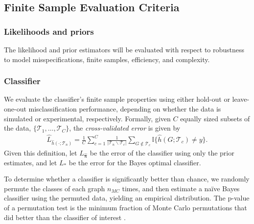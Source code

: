 \documentclass[10pt,journal,cspaper,compsoc]{IEEEtran}
\newcommand{\II}{\mathbb{I}}           %
\providecommand{\mc}[1]{\mathcal{#1}}
\providecommand{\wh}[1]{\widehat{#1}}
\providecommand{\mhb}[1]{\hat{\boldsymbol{#1}}}
\begin{document}
\subsection{Finite Sample Evaluation Criteria} %
\label{sub:evaluation_criteria}


\subsubsection{Likelihoods and priors} %
\label{ssub:likelihoods_and_priors}

The likelihood and prior estimators will be evaluated with respect to robustness to model misspecifications, finite samples, efficiency, and complexity.




\subsubsection{Classifier} %
\label{ssub:classifier}

We evaluate the classifier's finite sample properties using either hold-out or leave-one-out misclassification performance, depending on whether the data is simulated or experimental, respectively.  Formally, given $C$ equally sized subsets of the data, $\{\mc{T}_{1}, \ldots, \mc{T}_{C}\}$, the \emph{cross-validated error} is given by
\begin{align} \label{eq:L2}
	\wh{L}_{\wh{h}(\cdot; \mc{T}_n)} = \frac{1}{C}\sum_{c=1}^C \frac{1}{|\mc{T}_n \backslash \mc{T}_c|}\sum_{G \notin \mc{T}_c} \II\{\wh{h}(G; \mc{T}_{c}) \neq y\}.
\end{align}
Given this definition, let $L_{\mhb{\pi}}$ be the error of the classifier using only the prior estimates, and let $L_*$ be the error for the Bayes optimal classifier.  

To determine whether a classifier is significantly better than chance, we randomly permute the classes of each graph $n_{MC}$ times, and then estimate a na\"ive Bayes classifier using the permuted data, yielding an empirical distribution.  The p-value of a permutation test is the minimum fraction of Monte Carlo permutations that did better than the classifier of interest \cite{Good2010}.  
\end{document}
